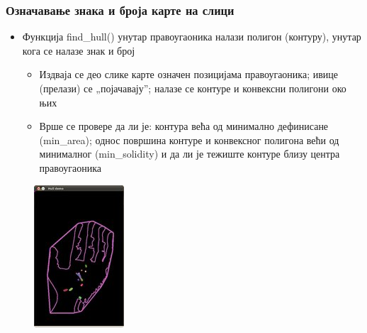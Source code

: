 \begin{frame}
\frametitle{Означавање знака и броја карте на слици}
\begin{itemize}
 \item Функција \alert{find\_hull()} унутар правоугаоника
 налази полигон (контуру), унутар кога се налазе знак и број
 \begin{itemize}
  \item Издваја се део слике карте означен позицијама правоугаоника;
  ивице (прелази) се „појачавају”; налазе се контуре и конвексни
  полигони око њих
  \item Врше се провере да ли је: контура већа од минимално дефинисане
  (\alert{min\_area});
  однос површина контуре и конвексног полигона
  већи од минималног (\alert{min\_solidity}) и
  да ли је тежиште контуре близу центра правоугаоника
 \end{itemize}

\end{itemize}
\begin{figure}[H]
  \centering
      \includegraphics[scale=0.4]{slike/Hull_Result.jpg}
 \end{figure}
\end{frame}

